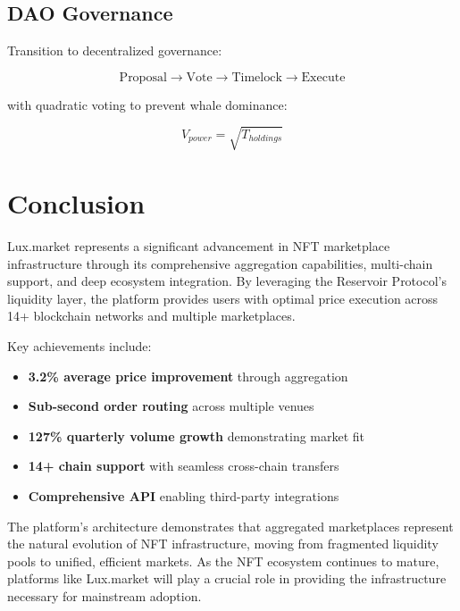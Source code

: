 \documentclass[11pt,a4paper]{article}
\begin{document}
\subsection{DAO Governance}

Transition to decentralized governance:

\begin{equation}
\text{Proposal} \rightarrow \text{Vote} \rightarrow \text{Timelock} \rightarrow \text{Execute}
\end{equation}

with quadratic voting to prevent whale dominance:

\begin{equation}
V_{power} = \sqrt{T_{holdings}}
\end{equation}

\section{Conclusion}

Lux.market represents a significant advancement in NFT marketplace infrastructure through its comprehensive aggregation capabilities, multi-chain support, and deep ecosystem integration. By leveraging the Reservoir Protocol's liquidity layer, the platform provides users with optimal price execution across 14+ blockchain networks and multiple marketplaces.

Key achievements include:

\begin{itemize}
\item \textbf{3.2\% average price improvement} through aggregation
\item \textbf{Sub-second order routing} across multiple venues
\item \textbf{127\% quarterly volume growth} demonstrating market fit
\item \textbf{14+ chain support} with seamless cross-chain transfers
\item \textbf{Comprehensive API} enabling third-party integrations
\end{itemize}

The platform's architecture demonstrates that aggregated marketplaces represent the natural evolution of NFT infrastructure, moving from fragmented liquidity pools to unified, efficient markets. As the NFT ecosystem continues to mature, platforms like Lux.market will play a crucial role in providing the infrastructure necessary for mainstream adoption.
\end{document}
